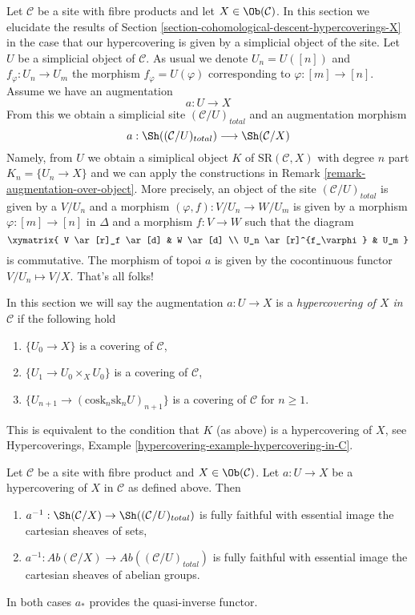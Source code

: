 \noindent
Let $\mathcal{C}$ be a site with fibre products and
let $X \in \Ob(\mathcal{C})$.
In this section we elucidate the results of
Section \ref{section-cohomological-descent-hypercoverings-X}
in the case that our hypercovering is given by
a simplicial object of the site.
Let $U$ be a simplicial object of $\mathcal{C}$.
As usual we denote $U_n = U([n])$ and $f_\varphi : U_n \to U_m$
the morphism $f_\varphi = U(\varphi)$ corresponding to
$\varphi : [m] \to [n]$.
Assume we have an augmentation
$$
a : U \to X
$$
From this we obtain a simplicial site $(\mathcal{C}/U)_{total}$
and an augmentation morphism
$$
a : \Sh((\mathcal{C}/U)_{total}) \longrightarrow \Sh(\mathcal{C}/X)
$$
Namely, from $U$ we obtain a simiplical object $K$ of
$\text{SR}(\mathcal{C}, X)$ with degree $n$ part
$K_n = \{U_n \to X\}$ and we can apply the constructions in
Remark \ref{remark-augmentation-over-object}.
More precisely, an object of the site $(\mathcal{C}/U)_{total}$ is given by
a $V/U_n$ and a morphism $(\varphi, f) : V/U_n \to W/U_m$ is given
by a morphism $\varphi : [m] \to [n]$ in $\Delta$ and a morphism
$f : V \to W$ such that the diagram
$$
\xymatrix{
V \ar[r]_f \ar[d] & W \ar[d] \\
U_n \ar[r]^{f_\varphi} & U_m
}
$$
is commutative. The morphism of topoi $a$ is given by the cocontinuous
functor $V/U_n \mapsto V/X$. That's all folks!

\medskip\noindent
In this section we will say the augmentation $a : U \to X$ is a
{\it hypercovering of $X$ in $\mathcal{C}$} if the following hold
\begin{enumerate}
\item $\{U_0 \to X\}$ is a covering of $\mathcal{C}$,
\item $\{U_1 \to U_0 \times_X U_0\}$ is a covering of $\mathcal{C}$,
\item $\{U_{n + 1} \to (\text{cosk}_n\text{sk}_n U)_{n + 1}\}$
is a covering of $\mathcal{C}$ for $n \geq 1$.
\end{enumerate}
This is equivalent to the condition that $K$ (as above) is a hypercovering
of $X$, see
Hypercoverings, Example \ref{hypercovering-example-hypercovering-in-C}.

\begin{lemma}
\label{lemma-hypercovering-X-simple-descent-sheaves}
Let $\mathcal{C}$ be a site with fibre product and $X \in \Ob(\mathcal{C})$.
Let $a : U \to X$ be a hypercovering of $X$ in $\mathcal{C}$ as defined above.
Then
\begin{enumerate}
\item $a^{-1} : \Sh(\mathcal{C}/X) \to \Sh((\mathcal{C}/U)_{total})$
is fully faithful with essential image the cartesian sheaves of sets,
\item $a^{-1} : \textit{Ab}(\mathcal{C}/X) \to
\textit{Ab}((\mathcal{C}/U)_{total})$
is fully faithful with essential image the cartesian sheaves
of abelian groups.
\end{enumerate}
In both cases $a_*$ provides the quasi-inverse functor.
\end{lemma}

